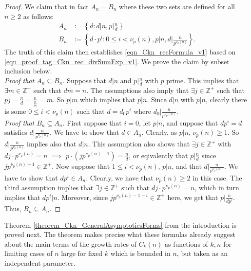 \documentclass[11pt,reqno,a4letter]{article}
\numberwithin{figure}{section}
\numberwithin{table}{section}
\theoremstyle{plain}
\numberwithin{theorem}{section}
\theoremstyle{definition}
\begin{document}
\begin{proof}
We claim that in fact $A_n = B_n$ where these two sets are defined for all $n \geq 2$ as follows: 
\begin{align*} 
A_n & := \left\{d: d|n, p \bigr\rvert\frac{n}{d}\right\} \\ 
B_n & := \left\{d \cdot p^i: 0 \leq i < \nu_p(n), p|n, d \biggr\rvert \frac{n}{p^{\nu_p(n)}} \right\}. 
\end{align*} 
The truth of this claim then establishes \eqref{eqn_Ckn_recFormula_v1} based on 
\eqref{eqn_proof_tag_Ckn_rec_divSumExp_v1}. We prove the claim by subset inclusion below. \\ 
\textit{Proof that $A_n \subseteq B_n$. } 
Suppose that $d|n$ and $p|\frac{n}{d}$ with $p$ prime. This implies that 
$\exists m \in \mathbb{Z}^{+}$ such that $dm=n$. The assumptions also imply that 
$\exists j \in \mathbb{Z}^{+}$ such that $pj = \frac{n}{d} = \frac{n}{\frac{n}{m}} = m$. 
So $p|m$ which implies that $p|n$. Since $d|n$ with $p|n$, clearly there is some $0 \leq i < \nu_p(n)$ 
such that $d = d_0p^i$ where $d_0 \bigr\rvert \frac{n}{p^{\nu_p(n)}}$. \\ 
\textit{Proof that $B_n \subseteq A_n$. } 
First suppose that $i = 0$, let $p|n$, and suppose that $dp^{i} = d$ satisfies 
$d \bigr\rvert \frac{n}{p^{\nu_p(n)}}$. We have to show that $d \in A_n$. Clearly, as $p|n$, $\nu_p(n) \geq 1$. 
So $d \bigr\rvert \frac{n}{p^{\nu_p(n)}}$ implies also that $d|n$. This assumption also shows that 
$\exists j \in \mathbb{Z}^{+}$ with $dj \cdot p^{\nu_p(n)} = n$ $\implies$ 
$p \cdot \left(j p^{\nu_p(n)-1}\right) = \frac{n}{d}$, or eqivalently that $p | \frac{n}{d}$ since 
$j p^{\nu_p(n)-1} \in \mathbb{Z}^{+}$. 
Now suppose that $1 \leq i < \nu_p(n)$, $p|n$, and that $d \bigr\rvert \frac{n}{p^{\nu_p(n)}}$. 
We have to show that $dp^{i} \in A_n$. Clearly, we have that $\nu_p(n) \geq 2$ in this case. 
The third assumption implies that $\exists j \in \mathbb{Z}^{+}$ such that $dj \cdot p^{\nu_p(n)} = n$, 
which in turn implies that $dp^{i} | n$. Moreover, since 
$j p^{\nu_p(n) - 1 - i} \in \mathbb{Z}^{+}$ here, 
we get that $p \bigr\rvert \frac{n}{dp^i}$. Thus, $B_n \subseteq A_n$. 
\end{proof} 

Theorem \ref{theorem_Ckn_GeneralAsymptoticsForms} from the introduction is proved next. 
The theorem makes precise what these formulas already 
suggest about the main terms of the growth rates of 
$C_k(n)$ as functions of $k,n$ for limiting cases of $n$ large for fixed $k$ which is bounded in $n$, 
but taken as an independent parameter. 
\end{document}
